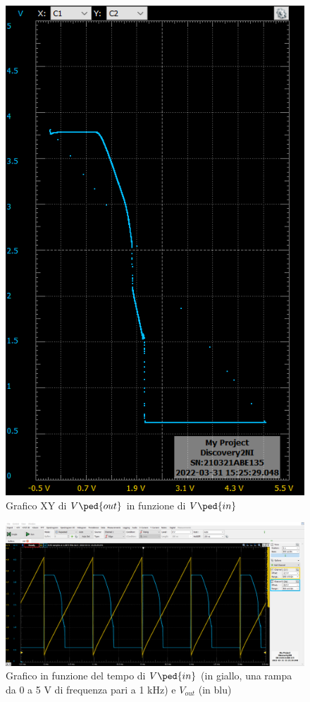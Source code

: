 \documentclass[10pt, a4paper, italian]{article}
\begin{document}
\begin{figure}[htbp]
\centering
	\includegraphics[scale=0.4]{not_xy1}
	\caption{Grafico XY di $V\ped{out}$ in funzione di $V\ped{in}$}
\end{figure}
\begin{figure}[htbp]
\centering
	\includegraphics[width=\textwidth]{not_time1}
	\caption{Grafico in funzione del tempo di $V\ped{in}$ (in giallo, una rampa da 0 a 5 V di frequenza pari a 1 kHz) e $V_{out}$ (in blu)}
\end{figure}
\end{document}
